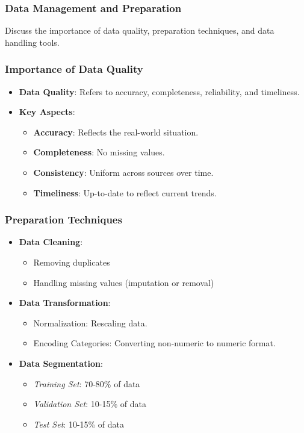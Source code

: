 \documentclass[aspectratio=169]{beamer}
\begin{document}
\begin{frame}[fragile]
    \frametitle{Data Management and Preparation}
    Discuss the importance of data quality, preparation techniques, and data handling tools.
\end{frame}

\begin{frame}[fragile]
    \frametitle{Importance of Data Quality}
    \begin{itemize}
        \item \textbf{Data Quality}: Refers to accuracy, completeness, reliability, and timeliness.
        \item \textbf{Key Aspects}:
        \begin{itemize}
            \item \textbf{Accuracy}: Reflects the real-world situation.
            \item \textbf{Completeness}: No missing values.
            \item \textbf{Consistency}: Uniform across sources over time.
            \item \textbf{Timeliness}: Up-to-date to reflect current trends.
        \end{itemize}
    \end{itemize}
\end{frame}

\begin{frame}[fragile]
    \frametitle{Preparation Techniques}
    \begin{itemize}
        \item \textbf{Data Cleaning}:
        \begin{itemize}
            \item Removing duplicates
            \item Handling missing values (imputation or removal)
        \end{itemize}
        \item \textbf{Data Transformation}:
        \begin{itemize}
            \item Normalization: Rescaling data.
            \item Encoding Categories: Converting non-numeric to numeric format.
        \end{itemize}
        \item \textbf{Data Segmentation}:
        \begin{itemize}
            \item \textit{Training Set}: 70-80\% of data
            \item \textit{Validation Set}: 10-15\% of data
            \item \textit{Test Set}: 10-15\% of data
        \end{itemize}
    \end{itemize}
\end{frame}
\end{document}
